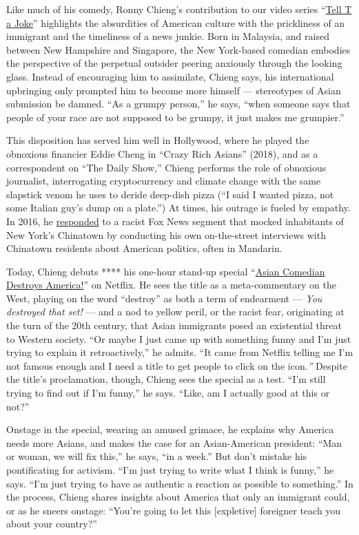 Like much of his comedy, Ronny Chieng's contribution to our video series
``\href{https://www.nytimes3xbfgragh.onion/video/t-magazine/100000006004756/tell-t-a-joke-natasha-lyonne.html}{Tell
T a Joke}'' highlights the absurdities of American culture with the
prickliness of an immigrant and the timeliness of a news junkie. Born in
Malaysia, and raised between New Hampshire and Singapore, the New
York-based comedian embodies the perspective of the perpetual outsider
peering anxiously through the looking glass. Instead of encouraging him
to assimilate, Chieng says, his international upbringing only prompted
him to become more himself --- stereotypes of Asian submission be
damned. ``As a grumpy person,'' he says, ``when someone says that people
of your race are not supposed to be grumpy, it just makes me grumpier.''

This disposition has served him well in Hollywood, where he played the
obnoxious financier Eddie Cheng in ``Crazy Rich Asians'' (2018), and as
a correspondent on ``The Daily Show,'' Chieng performs the role of
obnoxious journalist, interrogating cryptocurrency and climate change
with the same slapstick venom he uses to deride deep-dish pizza (``I
said I wanted pizza, not some Italian guy's dump on a plate.'') At
times, his outrage is fueled by empathy. In 2016, he
\href{https://www.youtube.com/watch?v=rX8jZTN0CdU}{responded} to a
racist Fox News segment that mocked inhabitants of New York's Chinatown
by conducting his own on-the-street interviews with Chinatown residents
about American politics, often in Mandarin.

Today, Chieng debuts **** his one-hour stand-up special
``\href{https://www.netflix.com/title/81070659}{Asian Comedian Destroys
America!}'' on Netflix. He sees the title as a meta-commentary on the
West, playing on the word ``destroy'' as both a term of endearment ---
\emph{You destroyed that set!} --- and a nod to yellow peril, or the
racist fear, originating at the turn of the 20th century, that Asian
immigrants posed an existential threat to Western society. ``Or maybe I
just came up with something funny and I'm just trying to explain it
retroactively,'' he admits. ``It came from Netflix telling me I'm not
famous enough and I need a title to get people to click on the
icon.\emph{''} Despite the title's proclamation, though, Chieng sees the
special as a test. ``I'm still trying to find out if I'm funny,'' he
says. ``Like, am I actually good at this or not?''

Onstage in the special, wearing an amused grimace, he explains why
America needs more Asians, and makes the case for an Asian-American
president: ``Man or woman, we will fix this,'' he says, ``in a week.''
But don't mistake his pontificating for activism. ``I'm just trying to
write what I think is funny,'' he says. ``I'm just trying to have as
authentic a reaction as possible to something.'' In the process, Chieng
shares insights about America that only an immigrant could, or as he
sneers onstage: ``You're going to let this {[}expletive{]} foreigner
teach you about your country?''

